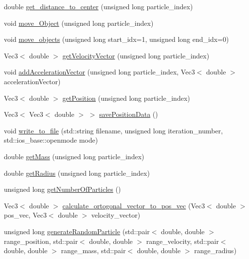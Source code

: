 \begin{DoxyCompactItemize}
\item 
double \hyperlink{classParticle_abf747e26491e7a7af1792aa7d0d69aef}{get\+\_\+distance\+\_\+to\+\_\+center} (unsigned long particle\+\_\+index)
\item 
void \hyperlink{classParticle_a8216ccd02b4d81b99afe7dba67464393}{move\+\_\+\+Object} (unsigned long particle\+\_\+index)
\item 
void \hyperlink{classParticle_ab110062c4b5f2ee718d8adc598a461c2}{move\+\_\+objects} (unsigned long start\+\_\+idx=1, unsigned long end\+\_\+idx=0)
\item 
Vec3$<$ double $>$ \hyperlink{classParticle_a2c1432771a7136cefed15c4032492386}{get\+Velocity\+Vector} (unsigned long particle\+\_\+index)
\item 
void \hyperlink{classParticle_a693efabec6e47d2aec0cf70d3eae983b}{add\+Acceleration\+Vector} (unsigned long particle\+\_\+index, Vec3$<$ double $>$ acceleration\+Vector)
\item 
Vec3$<$ double $>$ \hyperlink{classParticle_a8912fcab8b7a963bc8a4002176463d00}{get\+Position} (unsigned long particle\+\_\+index)
\item 
Vec3$<$ Vec3$<$ double $>$ $>$ \hyperlink{classParticle_a2cb38b3e1f0ca76084ce6f3b6c88f78f}{save\+Position\+Data} ()
\item 
void \hyperlink{classParticle_a09d3893513e28a124301446a03de4c2c}{write\+\_\+to\+\_\+file} (std\+::string filename, unsigned long iteration\+\_\+number, std\+::ios\+\_\+base\+::openmode mode)
\item 
double \hyperlink{classParticle_abfd6556526b15b5bee3384ae7baec48b}{get\+Mass} (unsigned long particle\+\_\+index)
\item 
double \hyperlink{classParticle_a699d893583b4fabeffd48c0a509bd50e}{get\+Radius} (unsigned long particle\+\_\+index)
\item 
unsigned long \hyperlink{classParticle_a06514801da39b213dc9d408d40e2adc1}{get\+Number\+Of\+Particles} ()
\item 
Vec3$<$ double $>$ \hyperlink{classParticle_aa42c00ad9144eddd0fde06255a4169c9}{calculate\+\_\+ortogonal\+\_\+vector\+\_\+to\+\_\+pos\+\_\+vec} (Vec3$<$ double $>$ pos\+\_\+vec, Vec3$<$ double $>$ velocity\+\_\+vector)
\item 
unsigned long \hyperlink{classParticle_af9d4982b196dbcaf9cdf59377dd5b2ee}{generate\+Random\+Particle} (std\+::pair$<$ double, double $>$ range\+\_\+position, std\+::pair$<$ double, double $>$ range\+\_\+velocity, std\+::pair$<$ double, double $>$ range\+\_\+mass, std\+::pair$<$ double, double $>$ range\+\_\+radius)

\end{DoxyCompactItemize}
